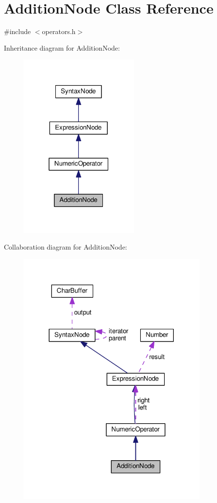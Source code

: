 \hypertarget{classAdditionNode}{}\section{Addition\+Node Class Reference}
\label{classAdditionNode}


{\ttfamily \#include $<$operators.\+h$>$}



Inheritance diagram for Addition\+Node\+:
\nopagebreak
\begin{figure}[H]
\begin{center}
\leavevmode
\includegraphics[width=171pt]{dc/d91/classAdditionNode__inherit__graph}
\end{center}
\end{figure}


Collaboration diagram for Addition\+Node\+:
\nopagebreak
\begin{figure}[H]
\begin{center}
\leavevmode
\includegraphics[width=272pt]{d1/d6d/classAdditionNode__coll__graph}
\end{center}
\end{figure}
